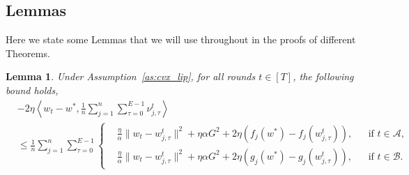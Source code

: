 \documentclass{article} %
\newtheorem{lemma}[]{Lemma}
\def\A{{\mathcal A}}
\def\B{{\mathcal B}}
\begin{document}
\subsection{Lemmas}
Here we state some Lemmas that we will use throughout in the proofs of different Theorems.
\begin{lemma}
    \label{lem:inner_prod_comp}
    Under Assumption~\ref{as:cvx_lip}, for all rounds $t\in[T]$, the following bound holds,
\[
\begin{aligned}
 &-2\eta \left\langle w_t - w^*, \frac{1}{n} \sum_{j=1}^n \sum_{\tau=0}^{E-1} \nu_{j,\tau}^t  \right\rangle  \\
&\leq \frac{1}{n} \sum_{j=1}^n \sum_{\tau=0}^{E-1}
\left\{
\begin{aligned}
&\frac{\eta}{\alpha} \| w_t - w_{j,\tau}^t \|^2 
+ \eta \alpha G^2 
+ 2\eta (f_j(w^*) - f_j(w_{j,\tau}^t)), 
&& \text{if } t \in \A, \\
&\frac{\eta}{\alpha} \| w_t - w_{j,\tau}^t \|^2 
+ \eta \alpha G^2 
+ 2\eta (g_j(w^*) - g_j(w_{j,\tau}^t)), 
&& \text{if } t \in \B.
\end{aligned}
\right.
\end{aligned}
\]
\end{lemma}
\end{document}
